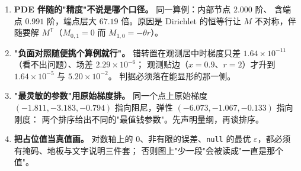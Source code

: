 \begin{enumerate}
        是干净窗口（$1.67\times10^{-4}$）的 $60$ 倍；被污染的行必须打掩码，
        而不是把连续律继续画过去。
  \item \textbf{PDE 伴随的"精度"不说是哪个口径。} 同一算例：内部节点 $2.000$ 阶、
        含端点 $0.991$ 阶，端点层大 $67.19$ 倍。原因是 Dirichlet 的恒等行让
        $M$ 不对称，伴随要解 $M^{\mathsf T}$（$M_{0,1}=0$ 而 $M_{1,0}=-\theta r$）。
  \item \textbf{"负面对照随便挑个算例就行"。} 错转置在观测居中时梯度只差
        $1.64\times10^{-11}$（看不出问题）、场差 $2.29\times10^{-6}$；
        观测贴边（$x=0.9$、$r=2$）才升到 $1.64\times10^{-5}$ 与 $5.20\times10^{-2}$。
        判据必须落在能显形的那一侧。
  \item \textbf{"最灵敏的参数"用原始梯度排。} 同一个点上原始梯度
        $(-1.811,-3.183,-0.794)$ 指向阻尼，弹性 $(-6.073,-1.067,-0.133)$ 指向刚度：
        两个排序给出不同的"最值钱参数"。先声明量纲，再谈排序。
  \item \textbf{把占位值当真值画。} 对数轴上的 $0$、非有限的误差、\texttt{null} 的最优
        $\varepsilon$，都必须有掩码、地板与文字说明三件套；
        否则图上"少一段"会被读成"一直是那个值"。
\end{enumerate}
